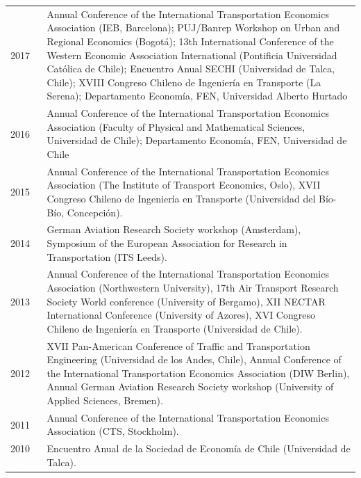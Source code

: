 \documentclass[10pt,a4paper]{article}
\begin{document}
\begin{tabularx}{\textwidth}{l X}
2017 & Annual Conference of the International Transportation Economics Association (IEB, Barcelona); PUJ/Banrep Workshop on Urban and Regional Economics (Bogotá); 13th International Conference of the Western Economic Association International (Pontificia Universidad Católica de Chile); Encuentro Anual SECHI (Universidad de Talca, Chile); XVIII Congreso Chileno de Ingenier\'{i}a en Transporte (La Serena);  Departamento Economía, FEN, Universidad Alberto Hurtado \\
2016 & Annual Conference of the International Transportation Economics Association (Faculty of Physical and Mathematical Sciences, Universidad de Chile);  Departamento Economía, FEN, Universidad de Chile \\
2015 & Annual Conference of the International Transportation Economics Association (The Institute of Transport Economics, Oslo), XVII Congreso Chileno de Ingenier\'{i}a en Transporte (Universidad del B\'{i}o-B\'{i}o, Concepci\'{o}n). \\
2014 & German Aviation Research Society workshop (Amsterdam), Symposium of the European Association for Research in Transportation (ITS Leeds). \\
2013 & Annual Conference of the International Transportation Economics Association (Northwestern University), 17th Air Transport Research Society World conference (University of Bergamo), XII NECTAR International Conference (University of Azores), XVI Congreso Chileno de Ingeniería en Transporte (Universidad de Chile). \\
2012 &  XVII Pan-American Conference of Traffic and Transportation Engineering (Universidad de los Andes, Chile), Annual Conference of the International Transportation Economics Association (DIW Berlin), Annual German Aviation Research Society workshop (University of Applied Sciences, Bremen).\\
2011 & Annual Conference of the International Transportation Economics Association (CTS, Stockholm).\\
2010\textcolor{white}{--2010} & Encuentro Anual de la Sociedad de Economía de Chile (Universidad de Talca).
\end{tabularx}

\end{document}
